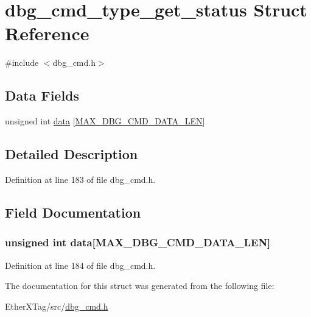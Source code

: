 \hypertarget{structdbg__cmd__type__get__status}{\section{dbg\-\_\-cmd\-\_\-type\-\_\-get\-\_\-status Struct Reference}
\label{structdbg__cmd__type__get__status}
}


{\ttfamily \#include $<$dbg\-\_\-cmd.\-h$>$}

\subsection*{Data Fields}
\begin{DoxyCompactItemize}
\item 
unsigned int \hyperlink{structdbg__cmd__type__get__status_abf020699b43e0c558a6fdf56f12b92ec}{data} \mbox{[}\hyperlink{dbg__cmd_8h_a4552ec15033c8a68870cdf80eda5470c}{M\-A\-X\-\_\-\-D\-B\-G\-\_\-\-C\-M\-D\-\_\-\-D\-A\-T\-A\-\_\-\-L\-E\-N}\mbox{]}
\end{DoxyCompactItemize}


\subsection{Detailed Description}


Definition at line 183 of file dbg\-\_\-cmd.\-h.



\subsection{Field Documentation}
\hypertarget{structdbg__cmd__type__get__status_abf020699b43e0c558a6fdf56f12b92ec}{
\subsubsection[{data}]{\setlength{\rightskip}{0pt plus 5cm}unsigned int data\mbox{[}{\bf M\-A\-X\-\_\-\-D\-B\-G\-\_\-\-C\-M\-D\-\_\-\-D\-A\-T\-A\-\_\-\-L\-E\-N}\mbox{]}}}\label{structdbg__cmd__type__get__status_abf020699b43e0c558a6fdf56f12b92ec}


Definition at line 184 of file dbg\-\_\-cmd.\-h.



The documentation for this struct was generated from the following file\-:\begin{DoxyCompactItemize}
\item 
Ether\-X\-Tag/src/\hyperlink{dbg__cmd_8h}{dbg\-\_\-cmd.\-h}\end{DoxyCompactItemize}
